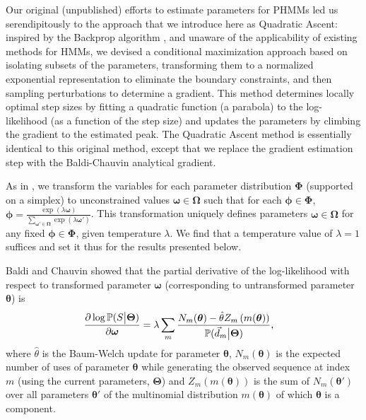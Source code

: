 \documentclass[preprint,12pt,authoryear]{elsarticle}
\newcommand{\Sequences}{\ensuremath{S}}
\newcommand{\Parameters}{\ensuremath{\bm{\Theta}}}
\newcommand{\BoltzmannTransformedParameters}{\ensuremath{\bm{\Omega}}}
\newcommand{\boltzmannTransformTemperature}{\ensuremath{\lambda}}
\newcommand{\ParametersSubset}{\ensuremath{\bm{\Phi}}}
\newcommand{\ExpectedCounts}{\ensuremath{N}}
\newcommand{\TotalExpectedCounts}{\ensuremath{Z}}
\newcommand{\parameter}{\ensuremath{\bm{\theta}}}
\newcommand{\parametersSubsetParameter}{\ensuremath{\bm{\phi}}}
\newcommand{\boltzmannTransformedParameter}{\ensuremath{\bm{\omega}}}
\newcommand{\parameterValue}{\ensuremath{\theta}}
\newcommand{\sequenceIndex}{\ensuremath{m}}
\newcommand{\datum}{\ensuremath{d}}
\newcommand{\bwParameterValue}{\ensuremath{\hat{\parameterValue}}}
\newcommand{\otherParameter}{\ensuremath{\parameter '}}
\newcommand{\multinomial}{\ensuremath{m}}
\newcommand{\Prob}{\ensuremath{\mathbb P}}
\begin{document}
Our original (unpublished) efforts to estimate parameters for PHMMs
led us serendipitously to the approach that we introduce here as
Quadratic Ascent: inspired by the Backprop algorithm
\citep{Rumelhart:1986}, and unaware of the applicability of existing
methods for HMMs, we devised a conditional maximization approach based
on isolating subsets of the parameters, transforming them to a
normalized exponential representation to eliminate the boundary
constraints, and then sampling perturbations to determine a gradient.
This method determines locally optimal step sizes by fitting a
quadratic function (a parabola) to the log-likelihood (as a function
of the step size) and updates the parameters by climbing the gradient
to the estimated peak.  The Quadratic Ascent method is essentially
identical to this original method, except that we replace the gradient
estimation step with the Baldi-Chauvin analytical gradient.

As in \cite{Baldi:1994}, we transform the variables for each
parameter distribution $\ParametersSubset$ (supported on a simplex) to unconstrained values
$\boltzmannTransformedParameter \in \BoltzmannTransformedParameters$ such that for each
$\parametersSubsetParameter \in \ParametersSubset$,
$\parametersSubsetParameter =
\frac{\exp(\boltzmannTransformTemperature
  \boltzmannTransformedParameter)}{\sum_{\boltzmannTransformedParameter'
    \in \BoltzmannTransformedParameters}{\exp(\boltzmannTransformTemperature \boltzmannTransformedParameter')}}$.
This transformation uniquely defines parameters $\boltzmannTransformedParameter \in
\BoltzmannTransformedParameters$ for any fixed
$\parametersSubsetParameter \in \ParametersSubset$, given temperature
$\boltzmannTransformTemperature$.  We find that a temperature value of
$\boltzmannTransformTemperature = 1$ suffices and set it thus for the
results presented below.

Baldi and Chauvin showed that the partial derivative of the
log-likelihood with respect to transformed parameter
$\boltzmannTransformedParameter$ (corresponding to untransformed
parameter $\parameter$) is 
\begin{equation*}
\begin{split}
\frac{\partial \log \Prob ( \Sequences \big| \Parameters )}{\partial \boltzmannTransformedParameter}
 &= \boltzmannTransformTemperature \sum_{\sequenceIndex}{ \frac{
     \ExpectedCounts_{\sequenceIndex}( \parameter ) -
     \bwParameterValue \TotalExpectedCounts_{\sequenceIndex} \left(
       \multinomial( \parameter ) \right) } {
     \Prob ( \vec{\datum}_{\sequenceIndex} \big| \Parameters ) } } \hbox{,}
\end{split}
\end{equation*}
where  $\bwParameterValue$ is the Baum-Welch
update for parameter $\parameter$, $\ExpectedCounts_{\sequenceIndex}( \parameter )$ is the expected number of uses
of parameter $\parameter$ while generating the observed sequence at
index $\sequenceIndex$ (using the current parameters, $\Parameters$) and
$\TotalExpectedCounts_{\sequenceIndex} \left( \multinomial( \parameter ) \right)$ is
the sum of $\ExpectedCounts_{\sequenceIndex} ( \otherParameter )$ over all parameters
$\otherParameter$ of the multinomial distribution
$\multinomial( \parameter )$ of which
$\parameter$ is a component.
\end{document}
